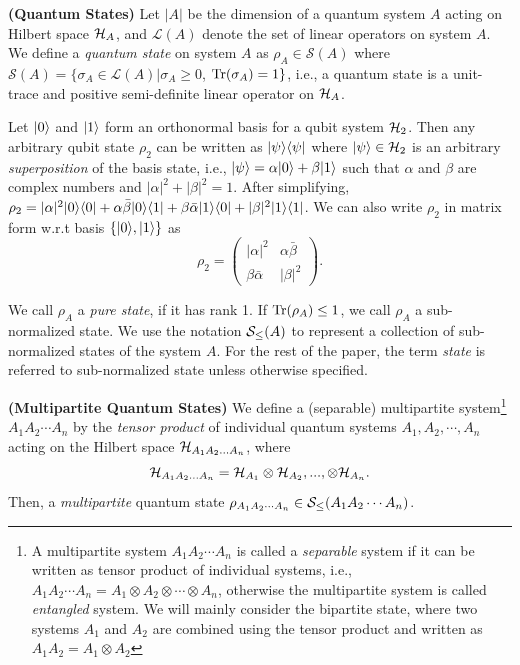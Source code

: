 \begin{definition}\textbf{(Quantum States)}
Let $|A|$ be the dimension of a quantum system $A$ acting on Hilbert space $\mathcal{H}_A$, and $\mathcal{L}(A)$ denote the set of linear operators on system $A$. We define a \emph{quantum state} on system $A$ as $\rho_{A} \in \mathcal{S}(A)$ where $\mathcal{S}(A) = \{ \sigma_{A} \in \mathcal{L}(A) | \sigma_{A} \geq 0$, $\operatorname{Tr}(\sigma_A) = 1\}$, i.e., a quantum state is a unit-trace and positive semi-definite linear operator on $\mathcal{H}_A$. 
\end{definition}
\begin{example}
    Let $|0 \rangle$ and $|1 \rangle$ form an orthonormal basis for a qubit system $\mathcal{H}_2$. Then any arbitrary qubit state $\rho_2$ can be written as $|\psi \rangle\langle \psi|$ where $|\psi \rangle \in \mathcal{H}_2$ is an arbitrary \textit{superposition} of the basis state, i.e., 
$|\psi \rangle = \alpha|0 \rangle + \beta |1 \rangle$
such that $\alpha$ and $\beta$ are complex numbers and $|\alpha|^2 + |\beta|^2=1$. After simplifying, $\rho_2 = |\alpha|^2 |0 \rangle\langle 0| + \alpha \bar{\beta}|0 \rangle\langle 1| + \beta \bar{\alpha}|1 \rangle\langle 0| + |\beta|^2 |1 \rangle\langle 1|$. We can also write $\rho_2$ in matrix form w.r.t basis $\{|0 \rangle, |1 \rangle\}$ as
\[\rho_2 =  \begin{pmatrix}
|\alpha|^2 & \alpha \bar{\beta}\\
\beta \bar{\alpha} & |\beta|^2
\end{pmatrix}.\]
\end{example}


We call $\rho_A$ a \emph{pure state}, if it has rank 1.
If $\operatorname{Tr}(\rho_A) \leq 1$, we call $\rho_A$ a sub-normalized state. We use the notation $\mathcal{S}_{\leq}(A)$ to represent a collection of sub-normalized states of the system $A$. For the rest of the paper, the term \emph{state} is referred to sub-normalized  state unless otherwise specified.
\begin{definition}\textbf{(Multipartite Quantum States)}
We define a (separable) multipartite system\footnote{A multipartite system $A_1A_2\cdots A_n$ is called a \textit{separable} system if it can be written as tensor product of individual systems, i.e., $A_1A_2\cdots A_n = A_1 \otimes A_2\otimes \cdots \otimes A_n$, otherwise the multipartite system is called \emph{entangled} system. We will mainly consider the bipartite state, where two systems $A_1$ and $A_2$ are combined using the tensor product and written as $A_1A_2 = A_1 \otimes A_2$} ${A_1A_2\cdots A_n}$ by the \emph{tensor product} of individual quantum systems $A_1, A_2, \cdots, A_n$ acting on the Hilbert space $\mathcal{H}_{A_1A_2...A_n}$, where 
$$\mathcal{H}_{A_1A_2...A_n} = \mathcal{H}_{A_1} \otimes \mathcal{H}_{A_2}, ...,  \otimes \mathcal{H}_{A_n}.$$
Then, a \textit{multipartite} quantum state $\rho_{A_1A_2\cdots A_n} \in \mathcal{S}_{\leq}(A_1A_2\cdots A_n)$. 
\end{definition}

